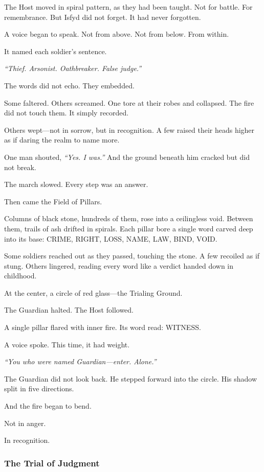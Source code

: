 \documentclass[12pt]{article}
\begin{document}
The Host moved in spiral pattern, as they had been taught. Not for battle. For remembrance. But Isfyd did not forget. It had never forgotten.

A voice began to speak. Not from above. Not from below. From within.

It named each soldier’s sentence.

\textit{``Thief. Arsonist. Oathbreaker. False judge.''}

The words did not echo. They embedded.

Some faltered. Others screamed. One tore at their robes and collapsed. The fire did not touch them. It simply recorded.

Others wept—not in sorrow, but in recognition. A few raised their heads higher as if daring the realm to name more.

One man shouted, \textit{``Yes. I was.''} And the ground beneath him cracked but did not break.

The march slowed. Every step was an answer.

Then came the Field of Pillars.

Columns of black stone, hundreds of them, rose into a ceilingless void. Between them, trails of ash drifted in spirals. Each pillar bore a single word carved deep into its base: \textsc{CRIME}, \textsc{RIGHT}, \textsc{LOSS}, \textsc{NAME}, \textsc{LAW}, \textsc{BIND}, \textsc{VOID}.

Some soldiers reached out as they passed, touching the stone. A few recoiled as if stung. Others lingered, reading every word like a verdict handed down in childhood.

At the center, a circle of red glass—the Trialing Ground.

The Guardian halted. The Host followed.

A single pillar flared with inner fire. Its word read: \textsc{WITNESS}.

A voice spoke. This time, it had weight.

\textit{``You who were named Guardian—enter. Alone.''}

The Guardian did not look back. He stepped forward into the circle. His shadow split in five directions.

And the fire began to bend.

Not in anger.

In recognition.

\dotfill

\subsubsection*{The Trial of Judgment}
\end{document}
